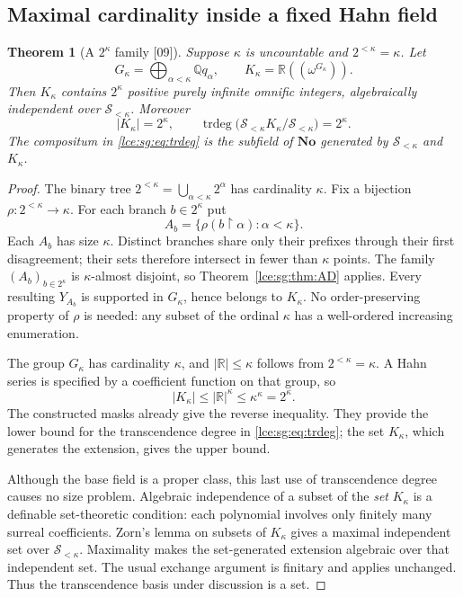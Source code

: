 \documentclass[11pt,letterpaper]{article}
\numberwithin{equation}{section}
\newtheorem{theorem}{Theorem}[section]
\theoremstyle{definition}
\theoremstyle{remark}
\newcommand{\No}{\mathbf{No}}
\newcommand{\R}{\mathbb R}
\newcommand{\Q}{\mathbb Q}
\newcommand{\Sk}{\mathscr S_{<\kappa}}
\newcommand{\abs}[1]{\lvert#1\rvert}
\newcommand{\res}{\mathbin{\upharpoonright}}
\newcommand{\thref}[1]{Theorem~\ref{#1}}
\newcommand{\src}[1]{\textup{\textsf{\small[#1]}}}%
\newcommand{\trdeg}{\operatorname{trdeg}}
\newcommand{\Hahn}[1]{\R((\omega^{#1}))}
\begin{document}
\subsection{Maximal cardinality inside a fixed Hahn field}
\begin{theorem}[A $2^\kappa$ family \src{09}]\label{lce:sg:thm:maximal}
Suppose $\kappa$ is uncountable and $2^{<\kappa}=\kappa$. Let
\[
 G_\kappa=\bigoplus_{\alpha<\kappa}\Q q_\alpha,
 \qquad K_\kappa=\Hahn{G_\kappa}.
\]
Then $K_\kappa$ contains $2^\kappa$ positive purely infinite omnific integers,
algebraically independent over $\Sk$. Moreover
\begin{equation}\label{lce:sg:eq:trdeg}
 \abs{K_\kappa}=2^\kappa,
 \qquad \trdeg\bigl(\Sk K_\kappa/\Sk\bigr)=2^\kappa.
\end{equation}
The compositum in \eqref{lce:sg:eq:trdeg} is the subfield of $\No$ generated
by $\Sk$ and $K_\kappa$.
\end{theorem}
\begin{proof}
The binary tree $2^{<\kappa}=\bigcup_{\alpha<\kappa}2^\alpha$ has
cardinality $\kappa$. Fix a bijection $\rho:2^{<\kappa}\to\kappa$. For each
branch $b\in2^\kappa$ put
\[
 A_b=\{\rho(b\res\alpha):\alpha<\kappa\}.
\]
Each $A_b$ has size $\kappa$. Distinct branches share only their prefixes
through their first disagreement; their sets therefore intersect in fewer
than $\kappa$ points. The family $(A_b)_{b\in2^\kappa}$ is
$\kappa$-almost disjoint, so \thref{lce:sg:thm:AD} applies. Every resulting
$Y_{A_b}$ is supported in $G_\kappa$, hence belongs to $K_\kappa$. No
order-preserving property of $\rho$ is needed: any subset of the ordinal
$\kappa$ has a well-ordered increasing enumeration.

The group $G_\kappa$ has cardinality $\kappa$, and $\abs\R\le\kappa$ follows
from $2^{<\kappa}=\kappa$. A Hahn series is specified by a coefficient
function on that group, so
\[
 \abs{K_\kappa}\le\abs\R^\kappa\le\kappa^\kappa=2^\kappa.
\]
The constructed masks already give the reverse inequality. They provide the
lower bound for the transcendence degree in \eqref{lce:sg:eq:trdeg}; the set
$K_\kappa$, which generates the extension, gives the upper bound.

Although the base field is a proper class, this last use of transcendence
degree causes no size problem. Algebraic independence of a subset of the
\emph{set} $K_\kappa$ is a definable set-theoretic condition: each
polynomial involves only finitely many surreal coefficients. Zorn's lemma on
subsets of $K_\kappa$ gives a maximal independent set over $\Sk$.
Maximality makes the set-generated extension algebraic over that
independent set. The usual exchange argument is finitary and applies
unchanged. Thus the transcendence basis under discussion is a set.
\end{proof}
\end{document}
